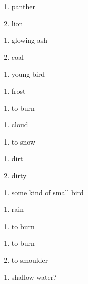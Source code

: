 \begin{enumerate}
\item panther
\item lion
\end{enumerate}
\begin{enumerate}
\item glowing ash
\item coal
\end{enumerate}
\begin{enumerate}
\item young bird
\end{enumerate}
\begin{enumerate}
\item frost
\end{enumerate}
\begin{enumerate}
\item to burn
\end{enumerate}
\begin{enumerate}
\item cloud
\end{enumerate}
\begin{enumerate}
\item to snow
\end{enumerate}
\begin{enumerate}
\item dirt
\item dirty
\end{enumerate}
\begin{enumerate}
\item some kind of small bird
\end{enumerate}
\begin{enumerate}
\item rain
\end{enumerate}
\begin{enumerate}
\item to burn
\end{enumerate}
\begin{enumerate}
\item to burn
\item to smoulder
\end{enumerate}
\begin{enumerate}
\item shallow water?
\end{enumerate}
